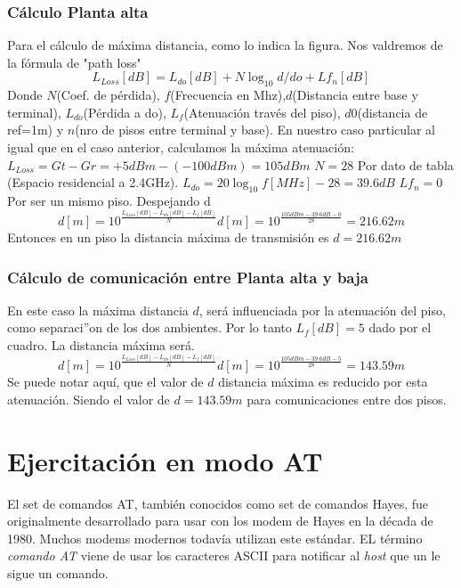 \documentclass[11pt,oneside,spanish,a4paper]{article}
\begin{document}
\subsubsection{C\'alculo Planta alta}
Para el c\'alculo de m\'axima distancia, como lo indica la figura. Nos valdremos de la f\'ormula de "path loss"
\begin{equation*}
\label{eq:pathLoss}
L_{Loss}[dB] = L_{do}[dB] + N \log_{10}d/do + Lf_{n}[dB]
\end{equation*}
Donde $N$(Coef. de p\'erdida), $f$(Frecuencia en Mhz),$d$(Distancia entre base y terminal), $L_{do}$(P\'erdida a do), $L_{f}$(Atenuaci\'on trav\'es del piso), $d0$(distancia de ref=1m) y $n$(nro de pisos entre terminal y base).
En nuestro caso particular al igual que en el caso anterior, calculamos la m\'axima atenuaci\'on:
$L_{Loss}= Gt - Gr = +5dBm - (-100dBm) = 105dBm$
$N=28$ Por dato de tabla (Espacio residencial a 2.4GHz).
$L_{do} = 20 \log_{10}f[MHz] - 28 = 39.6dB$
$Lf_{n} = 0$ Por ser un mismo piso.
Despejando d
\begin{equation*}
\label{eq:calculod}
d[m] = 10 ^{\frac{L_{Loss}[dB] - L_{do}[dB] - L_{f}[dB]}{N}} 
d[m] = 10 ^{\frac{105dBm - 39.6dB - 0}{28}} = 216.62m
\end{equation*}
Entonces en un piso la distancia m\'axima de transmisi\'on es $d=216.62m$

\subsubsection{C\'alculo de comunicaci\'on entre Planta alta y baja}
En este caso la m\'axima distancia $d$, ser\'a influenciada por la atenuaci\'on del piso, como separaci''on de los dos ambientes. Por lo tanto $L_{f}[dB]=5$ dado por el cuadro. La distancia m\'axima ser\'a.
\begin{equation*}
\label{eq:calculod}
d[m] = 10 ^{\frac{L_{Loss}[dB] - L_{do}[dB] - L_{f}[dB]}{N}} 
d[m] = 10 ^{\frac{105dBm - 39.6dB - 5}{28}} = 143.59m
\end{equation*}
Se puede notar aqu\'i, que el valor de $d$ distancia m\'axima es
reducido por esta atenuaci\'on. Siendo el valor de $d=143.59m$ para
comunicaciones entre dos pisos.

\section{Ejercitación en modo AT}
\label{sec:AT}

El set de comandos AT, también conocidos como set de comandos Hayes,
fue originalmente desarrollado para usar con los modem de Hayes en la
década de 1980. Muchos modems modernos todavía utilizan este
estándar. EL término \emph{comando AT}  viene de usar los caracteres
ASCII para notificar al \textsl{host}  que un le sigue un comando. 
\end{document}
